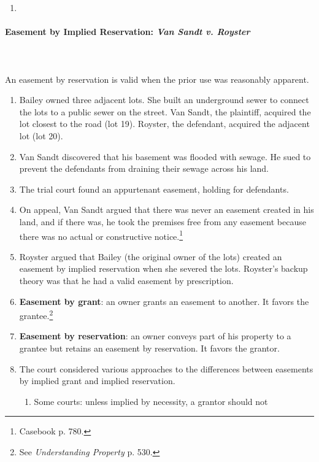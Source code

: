 \begin{enumerate}
    \item %
\end{enumerate}

\paragraph{Easement by Implied Reservation: \emph{Van Sandt v. Royster}}
~\\\\
An easement by reservation is valid when the prior use was reasonably 
apparent.

\begin{enumerate}
    \item Bailey owned three adjacent lots. She built an underground sewer to 
    connect the lots to a public sewer on the street. Van Sandt, the 
    plaintiff, acquired the lot closest to the road (lot 19). Royster, the 
    defendant, acquired the adjacent lot (lot 20).
    \item Van Sandt discovered that his basement was flooded with sewage. He 
    sued to prevent the defendants from draining their sewage across his land.
    \item The trial court found an appurtenant easement, holding for 
    defendants.
    \item On appeal, Van Sandt argued that there was never an easement 
    created in his land, and if there was, he took the premises free from any 
    easement because there was no actual or constructive 
    notice.\footnote{Casebook p. 780.}
    \item Royster argued that Bailey (the original owner of the lots) created 
    an easement by implied reservation when she severed the lots. Royster's 
    backup theory was that he had a valid easement by prescription.
    \item \textbf{Easement by grant}: an owner grants an easement to another. 
    It favors the grantee.\footnote{See \emph{Understanding Property} p. 530.}
    \item \textbf{Easement by reservation}: an owner conveys part of his 
    property to a grantee but retains an easement by reservation. It favors 
    the grantor.
    \item The court considered various approaches to the differences between 
    easements by implied grant and implied reservation.
    \begin{enumerate}
        \item Some courts: unless implied by necessity, a grantor should not 

\end{enumerate}
\end{enumerate}
